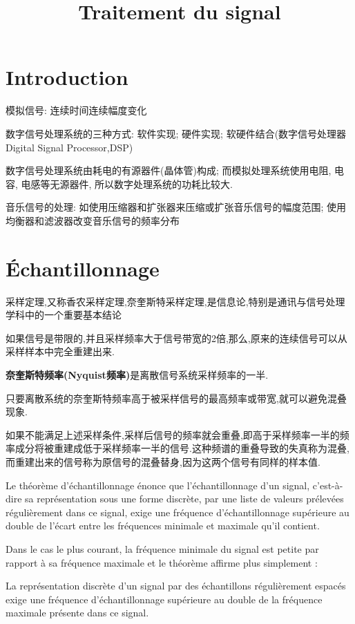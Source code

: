\documentclass{article}
\begin{document}
\title{Traitement du signal}
\maketitle
\tableofcontents
\newpage

\section{Introduction}
模拟信号: 连续时间连续幅度变化

数字信号处理系统的三种方式: 软件实现; 硬件实现; 软硬件结合(数字信号处理器Digital Signal Processor,DSP)

数字信号处理系统由耗电的有源器件(晶体管)构成; 而模拟处理系统使用电阻, 电容, 电感等无源器件, 所以数字处理系统的功耗比较大.

音乐信号的处理:  
如使用压缩器和扩张器来压缩或扩张音乐信号的幅度范围;
使用均衡器和滤波器改变音乐信号的频率分布

\section{\'Echantillonnage}
采样定理,又称香农采样定理,奈奎斯特采样定理,是信息论,特别是通讯与信号处理学科中的一个重要基本结论

如果信号是带限的,并且采样频率大于信号带宽的2倍,那么,原来的连续信号可以从采样样本中完全重建出来.

\textbf{奈奎斯特频率(Nyquist频率)}是离散信号系统采样频率的一半.

只要离散系统的奈奎斯特频率高于被采样信号的最高频率或带宽,就可以避免混叠现象.

如果不能满足上述采样条件,采样后信号的频率就会重叠,即高于采样频率一半的频率成分将被重建成低于采样频率一半的信号.这种频谱的重叠导致的失真称为混叠,而重建出来的信号称为原信号的混叠替身,因为这两个信号有同样的样本值.

Le théorème d'échantillonnage énonce que l'échantillonnage d'un signal, c'est-à-dire sa représentation sous une forme discrète, par une liste de valeurs prélevées régulièrement dans ce signal, exige une fréquence d'échantillonnage supérieure au double de l'écart entre les fréquences minimale et maximale qu'il contient.

Dans le cas le plus courant, la fréquence minimale du signal est petite par rapport à sa fréquence maximale et le théorème affirme plus simplement :

La représentation discrète d'un signal par des échantillons régulièrement espacés exige une fréquence d'échantillonnage supérieure au double de la fréquence maximale présente dans ce signal.
\end{document}
